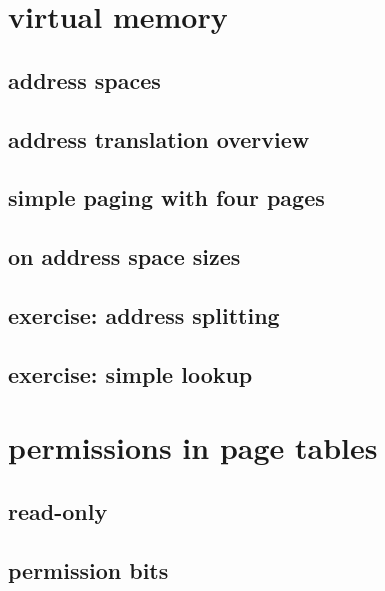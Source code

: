 

\section{virtual memory}

\subsection{address spaces}



\subsection{address translation overview}


\subsection{simple paging with four pages}


\subsection{on address space sizes}


\subsection{exercise: address splitting}


\subsection{exercise: simple lookup}


\section{permissions in page tables}
\subsection{read-only}

\subsection{permission bits}



